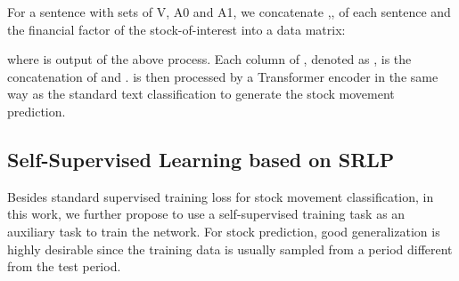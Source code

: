 \documentclass{article}
\begin{document}
For a sentence with  sets of V, A0 and A1, we concatenate ,, of each sentence and the financial factor  of the stock-of-interest into a data matrix: 

where  is output of the above process. Each column of , denoted as , is the concatenation of  and .  is then processed by a Transformer encoder in the same way as the standard text classification to generate the stock movement prediction. 





\subsection{Self-Supervised Learning based on SRLP}
Besides standard supervised training loss for stock movement classification, in this work, we further propose to use a self-supervised training task as an auxiliary task to train the network. For stock prediction, good generalization is highly desirable since the training data is usually sampled from a period different from the test period.
\end{document}

